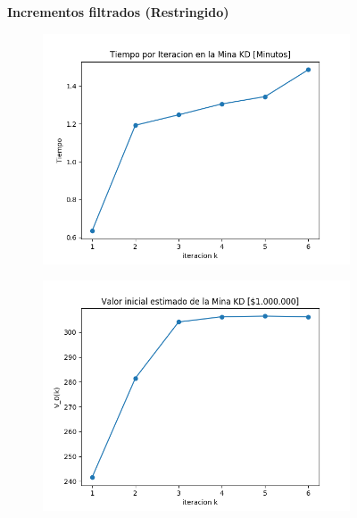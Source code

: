 \documentclass[12pt,letterpaper]{article}
\begin{document}
\begin{figure}[H]
  \textbf{Incrementos filtrados (Restringido)}
  
  \begin{subfigure}[b]{0.4\textwidth}
     \includegraphics[width=\textwidth]{Graficos/Incrementos_filtrados/restringido/kd_inc_times.png}
     \caption{}
     \label{fig:ex1}
  \end{subfigure}
  \begin{subfigure}[b]{0.4\textwidth}
     \includegraphics[width=\textwidth]{Graficos/Incrementos_filtrados/restringido/kd_inc_v_k.png}
     \caption{}
     \label{fig:ex2}
  \end{subfigure}
\end{figure}
\end{document}
